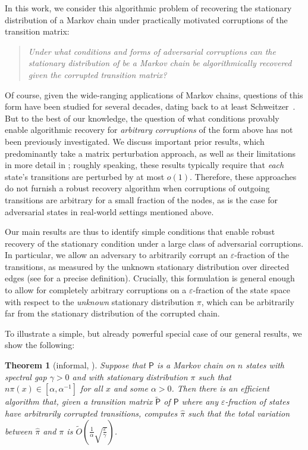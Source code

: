 \documentclass[11pt]{article}
\newtheorem{thm}{Theorem}[section]
\theoremstyle{remark}
\begin{document}
In this work, we consider this algorithmic problem of recovering the stationary distribution of a Markov chain under practically motivated corruptions of the transition matrix:

\begin{quote}
\centering
    \emph{Under what conditions and forms of adversarial corruptions can the stationary distribution of be a Markov chain be algorithmically recovered given the corrupted transition matrix?}
\end{quote}

Of course, given the wide-ranging applications of Markov chains, questions of this form have been studied for several decades, dating back to at least Schweitzer~\cite{schweitzer1968perturbation}. But to the best of our knowledge, the question of what conditions provably enable algorithmic recovery for \emph{arbitrary corruptions} of the form above has not been previously investigated. We discuss important prior results, which predominantly take a matrix perturbation approach, as well as their limitations in more detail in ; roughly speaking, these results typically require that \emph{each} state's transitions are perturbed by at most $o(1)$. Therefore, these approaches do not furnish a robust recovery algorithm when corruptions of outgoing transitions are arbitrary for 
a small fraction of the nodes, as is the case for 
adversarial states in real-world settings mentioned above. 

Our main results are thus to identify simple conditions that enable robust recovery of the stationary condition under a large class of adversarial corruptions. In particular, we allow an adversary to arbitrarily corrupt an $\varepsilon$-fraction of the transitions, as measured by the unknown stationary distribution over directed edges (see  for a precise definition). 
Crucially, this formulation is general enough to allow for completely arbitrary corruptions on a $\varepsilon$-fraction of the state space with respect to the \emph{unknown} stationary distribution $\pi$, which can be arbitrarily far from the stationary distribution of the corrupted chain.

To illustrate a simple, but already powerful special case of our general results, we show the following:

\begin{thm}[informal, ]
\label{thm:informal_1}
    Suppose that $\mathsf{P}$ is a Markov chain on $n$ states with spectral gap $\gamma > 0$ and with stationary distribution $\pi$ such that $n\pi(x)\in [\alpha,\alpha^{-1}]$ for all $x$ and some $\alpha > 0$.
    Then there is an efficient algorithm that, given a transition matrix $\widetilde{\mathsf{P}}$ of $\mathsf{P}$ where any $\varepsilon$-fraction of states have \emph{arbitrarily} corrupted transitions, computes $\hat{\pi}$ 
    such that the total variation between
    $\hat{\pi}$ and $\pi$ is 
    $\widetilde{O}\left(\frac{1}{\alpha}\sqrt{\frac{\varepsilon}{\gamma}}\right)$.
\end{thm}
\end{document}
